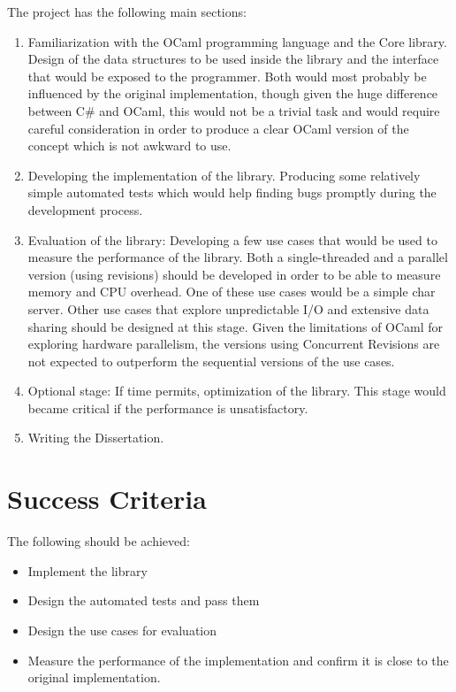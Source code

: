 The project has the following main sections:

\begin{enumerate}

\item Familiarization with the OCaml programming language and the Core library. Design of the data structures to be used inside the library and the interface that would be exposed to the programmer. Both would most probably be influenced by the original implementation, though given the huge difference between C\# and OCaml, this would not be a trivial task and would require careful consideration in order to produce a clear OCaml version of the concept which is not awkward to use.

\item Developing the implementation of the library. Producing some relatively simple automated tests which would help finding bugs promptly during the development process.

\item Evaluation of the library: Developing a few use cases that would be used to measure the performance of the library. Both a single-threaded and a parallel version (using revisions) should be developed in order to be able to measure memory and CPU overhead. One of these use cases would be a simple char server. Other use cases that explore unpredictable I/O and extensive data sharing should be designed at this stage. Given the limitations of OCaml for exploring hardware parallelism, the versions using Concurrent Revisions are not expected to outperform the sequential versions of the use cases.

\item Optional stage: If time permits, optimization of the library. This stage would became critical if the performance is unsatisfactory.

\item Writing the Dissertation.

\end{enumerate}


\section*{Success Criteria}

The following should be achieved:

\begin{itemize}

\item Implement the library

\item Design the automated tests and pass them

\item Design the use cases for evaluation

\item Measure the performance of the implementation and confirm it is close to the original implementation.

\end{itemize}


